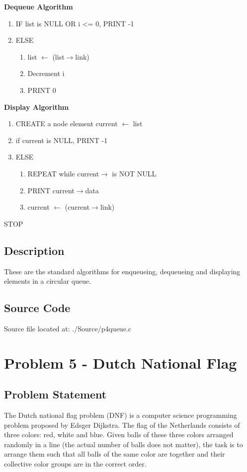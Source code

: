 \documentclass{article}
\begin{document}
\begin{flushleft}
\textbf{Dequeue Algorithm}
\begin{enumerate}
    \item IF list is NULL OR i <= 0, PRINT -1
    \item ELSE 
    \begin{enumerate}
        \item list $\leftarrow$ (list$\rightarrow$link)
        \item Decrement i
        \item PRINT 0
    \end{enumerate}
\end{enumerate}
\textbf{Display Algorithm}
\begin{enumerate}
    \item CREATE a node element current $\leftarrow$ list
    \item if current is NULL, PRINT -1
    \item ELSE
    \begin{enumerate}
        \item REPEAT while current$\rightarrow$ is NOT NULL
        \item PRINT current$\rightarrow$data
        \item current $\leftarrow$ (current$\rightarrow$link)
    \end{enumerate}
\end{enumerate}
STOP
\end{flushleft}
\subsection{Description}
These are the standard algorithms for enqueueing, dequeueing and displaying elements in a circular queue.
\subsection{Source Code}
Source file located at: ./Source/p4queue.c

\newpage
\section{Problem 5 - Dutch National Flag}
\subsection{Problem Statement}
The Dutch national flag problem (DNF) is a computer science programming problem proposed by Edsger Dijkstra. The flag of the Netherlands consists of three colors: red, white and blue. Given balls of these three colors arranged randomly in a line (the actual number of balls does not matter), the task is to arrange them such that all balls of the same color are together and their collective color groups are in the correct order.
\end{document}
